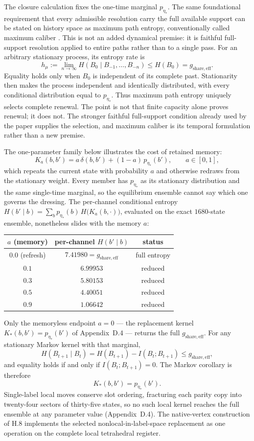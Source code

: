 \documentclass[11pt]{article}
\begin{document}
The closure calculation fixes the one-time marginal $p_{\eta_*}$. The same foundational requirement that every admissible resolution carry the full available support can be stated on history space as maximum path entropy, conventionally called maximum caliber \citep{Jaynes1980}. This is not an added dynamical premise: it is faithful full-support resolution applied to entire paths rather than to a single pass. For an arbitrary stationary process, its entropy rate is
\[
h_\mu
:=
\lim_{n\to\infty}H(B_0\mid B_{-1},\ldots,B_{-n})
\le H(B_0)=g_{\mathrm{share,eff}}.
\]
Equality holds only when $B_0$ is independent of its complete past. Stationarity then makes the process independent and identically distributed, with every conditional distribution equal to $p_{\eta_*}$. Thus maximum path entropy uniquely selects complete renewal. The point is not that finite capacity alone proves renewal; it does not. The stronger faithful full-support condition already used by the paper supplies the selection, and maximum caliber is its temporal formulation rather than a new premise.

The one-parameter family below illustrates the cost of retained memory:
\[
K_a(b,b')=a\,\delta(b,b')+(1-a)\,p_{\eta_*}(b'),
\qquad a\in[0,1],
\]
which repeats the current state with probability $a$ and otherwise redraws from the stationary weight. Every member has $p_{\eta_*}$ as its stationary distribution and the same single-time marginal, so the equilibrium ensemble cannot say which one governs the dressing. The per-channel conditional entropy $H(b'\mid b)=\sum_b p_{\eta_*}(b)\,H\bigl(K_a(b,\cdot)\bigr)$, evaluated on the exact $1680$-state ensemble, nonetheless slides with the memory $a$:
\begin{center}
\small
\begin{tabular}{ccc}
\hline
$a$ (memory) & per-channel $H(b'\mid b)$ & status \\
\hline
$0.0$ (refresh) & $7.41980=g_{\mathrm{share,eff}}$ & full entropy \\
$0.1$ & $6.99953$ & reduced \\
$0.3$ & $5.80153$ & reduced \\
$0.5$ & $4.40051$ & reduced \\
$0.9$ & $1.06642$ & reduced \\
\hline
\end{tabular}
\normalsize
\end{center}
Only the memoryless endpoint $a=0$ --- the replacement kernel $K_*(b,b')=p_{\eta_*}(b')$ of Appendix~D.4 --- returns the full $g_{\mathrm{share,eff}}$. For any stationary Markov kernel with that marginal,
\[
H(B_{t+1}\mid B_t)=H(B_{t+1})-I(B_t;B_{t+1})\le g_{\mathrm{share,eff}},
\]
and equality holds if and only if $I(B_t;B_{t+1})=0$. The Markov corollary is therefore
\[
\boxed{K_*(b,b')=p_{\eta_*}(b')}.
\]
Single-label local moves conserve slot ordering, fracturing each parity copy into twenty-four sectors of thirty-five states, so no such local kernel reaches the full ensemble at any parameter value (Appendix~D.4). The native-vertex construction of H.8 implements the selected nonlocal-in-label-space replacement as one operation on the complete local tetrahedral register.
\end{document}
